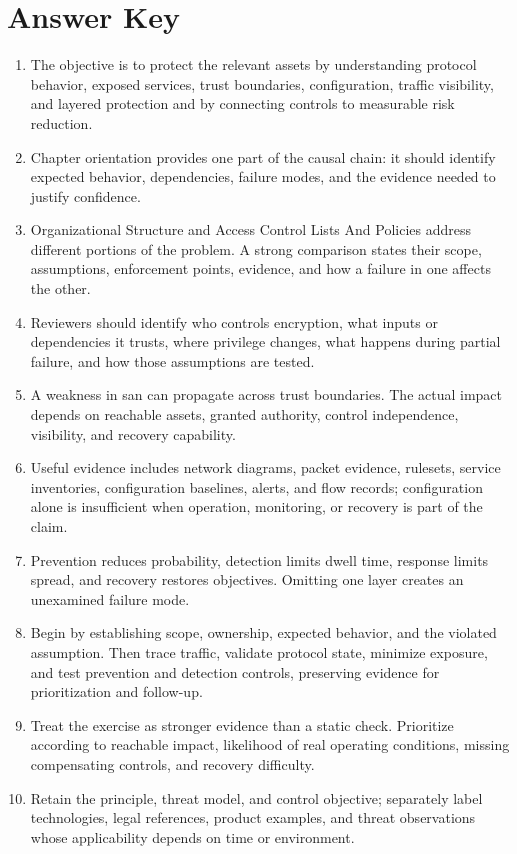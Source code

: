 \documentclass[11pt,letterpaper]{article}
\begin{document}
\section*{Answer Key}
\begin{enumerate}
\item The objective is to protect the relevant assets by understanding protocol behavior, exposed services, trust boundaries, configuration, traffic visibility, and layered protection and by connecting controls to measurable risk reduction.
\item Chapter orientation provides one part of the causal chain: it should identify expected behavior, dependencies, failure modes, and the evidence needed to justify confidence.
\item Organizational Structure and Access Control Lists And Policies address different portions of the problem. A strong comparison states their scope, assumptions, enforcement points, evidence, and how a failure in one affects the other.
\item Reviewers should identify who controls encryption, what inputs or dependencies it trusts, where privilege changes, what happens during partial failure, and how those assumptions are tested.
\item A weakness in san can propagate across trust boundaries. The actual impact depends on reachable assets, granted authority, control independence, visibility, and recovery capability.
\item Useful evidence includes network diagrams, packet evidence, rulesets, service inventories, configuration baselines, alerts, and flow records; configuration alone is insufficient when operation, monitoring, or recovery is part of the claim.
\item Prevention reduces probability, detection limits dwell time, response limits spread, and recovery restores objectives. Omitting one layer creates an unexamined failure mode.
\item Begin by establishing scope, ownership, expected behavior, and the violated assumption. Then trace traffic, validate protocol state, minimize exposure, and test prevention and detection controls, preserving evidence for prioritization and follow-up.
\item Treat the exercise as stronger evidence than a static check. Prioritize according to reachable impact, likelihood of real operating conditions, missing compensating controls, and recovery difficulty.
\item Retain the principle, threat model, and control objective; separately label technologies, legal references, product examples, and threat observations whose applicability depends on time or environment.
\end{enumerate}
\end{document}
